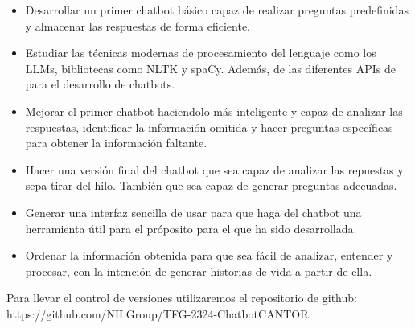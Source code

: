  \begin{itemize}
 	
\item Desarrollar un primer chatbot básico capaz de realizar preguntas predefinidas y almacenar las respuestas de forma eficiente.
 
 \item Estudiar las técnicas modernas de procesamiento del lenguaje como los LLMs, bibliotecas como NLTK y spaCy. Además, de las diferentes APIs de para el desarrollo de chatbots. 
 
\item Mejorar el primer chatbot haciendolo más inteligente y capaz de analizar las respuestas, identificar la información omitida y hacer preguntas específicas para obtener la información faltante.
 
\item Hacer una versión final del chatbot que sea capaz de analizar las repuestas y sepa tirar del hilo. También que sea capaz de generar preguntas adecuadas. 

\item Generar una interfaz sencilla de usar para que haga del chatbot una herramienta útil para el próposito para el que ha sido desarrollada.

\item Ordenar la información obtenida para que sea fácil de analizar, entender y procesar, con la intención de generar historias de vida a partir de ella. 

\end{itemize}

Para llevar el control de versiones utilizaremos el repositorio de github:\\
 https://github.com/NILGroup/TFG-2324-ChatbotCANTOR. 

